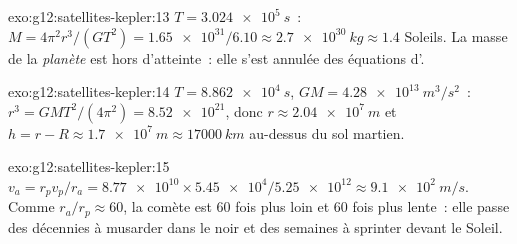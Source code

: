 \begin{solution}{exo:g12:satellites-kepler:13}
$T = \qty{3.024e5}{s}$~: $M = 4\pi^2 r^3/(GT^2) =
\num{1.65e31}/6.10 \approx \qty{2.7e30}{kg} \approx 1.4$ Soleils. La
masse de la \emph{planète} est hors d'atteinte~: elle s'est annulée des
équations d'.
\end{solution}

\begin{solution}{exo:g12:satellites-kepler:14}
$T = \qty{8.862e4}{s}$, $GM = \qty{4.28e13}{m^3/s^2}$~:
$r^3 = GMT^2/(4\pi^2) = \num{8.52e21}$, donc $r \approx
\qty{2.04e7}{m}$ et $h = r - R \approx \qty{1.7e7}{m} \approx
\qty{17000}{km}$ au-dessus du sol martien.
\end{solution}

\begin{solution}{exo:g12:satellites-kepler:15}
$v_a = r_p v_p / r_a = \num{8.77e10} \times \num{5.45e4} /
\num{5.25e12} \approx \qty{9.1e2}{m/s}$. Comme $r_a/r_p \approx 60$,
la comète est $60$ fois plus loin et $60$ fois plus lente~: elle passe
des décennies à musarder dans le noir et des semaines à sprinter devant
le Soleil.
\end{solution}


